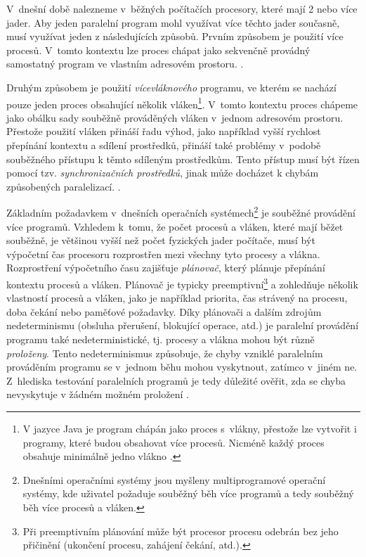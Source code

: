 V~dnešní době nalezneme v~běžných počítačích procesory, které mají 2 nebo více jader. Aby jeden paralelní program mohl využívat více těchto jader současně, musí využívat jeden z následujících způsobů. Prvním způsobem je použití více procesů. V~tomto kontextu lze proces chápat jako sekvenčně provádný samostatný program ve vlastním adresovém prostoru. %
\cite{cite:IPC, cite:paralel-programming}.

Druhým způsobem je použití \textit{vícevláknového} programu, ve kterém se nachází pouze jeden proces obsahující několik vláken\footnote{V jazyce Java je program chápán jako proces s~vlákny, přestože lze vytvořit i programy, které budou obsahovat více procesů. Nicméně každý proces obsahuje minimálně jedno vlákno \cite{cite:java}.}. V~tomto kontextu proces chápeme jako obálku sady souběžně prováděných vláken v~jednom adresovém prostoru. Přestože použití vláken přináší řadu výhod, jako například vyšší rychlost přepínání kontextu a sdílení prostředků, přináší také problémy v~podobě souběžného přístupu k těmto sdíleným prostředkům. Tento přístup musí být řízen pomocí tzv. \textit{synchronizačních prostředků}, jinak může docházet k chybám způsobených paralelizací. \cite{cite:paralel-programming}. 

Základním požadavkem v~dnešních operačních systémech\footnote{Dnešními operačními systémy jsou myšleny multiprogramové operační systémy, kde uživatel požaduje souběžný běh více programů a tedy souběžný běh více procesů a vláken.} je souběžné provádění více programů. Vzhledem k~tomu, že počet procesů a vláken, které mají běžet souběžně, je většinou vyšší než počet fyzických jader počítače, musí být výpočetní čas procesoru rozprostřen mezi všechny tyto procesy a vlákna. Rozprostření výpočetního času zajišťuje \textit{plánovač}, který plánuje přepínání kontextu procesů a vláken. Plánovač je typicky preemptivní\footnote{Při preemptivním plánování může být procesor procesu odebrán bez jeho přičinění (ukončení procesu, zahájení čekání, atd.).} a zohledňuje několik vlastností procesů a vláken, jako je například priorita, čas strávený na procesu, doba čekání nebo paměťové požadavky. Díky plánovači a dalším zdrojům nedeterminismu (obsluha přerušení, blokující operace, atd.) je paralelní provádění programu také nedeterministické, tj. procesy a vlákna mohou být různě \textit{proloženy}. Tento nedeterminismus způsobuje, že chyby vzniklé paralelním prováděním programu se v~jednom běhu mohou vyskytnout, zatímco v~jiném ne. Z~hlediska testování paralelních programů je tedy důležité ověřit, zda se chyba nevyskytuje v žádném možném proložení \cite{cite:OS1}.


